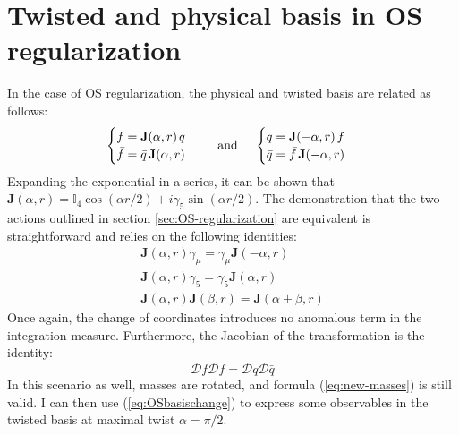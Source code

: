 \documentclass[english, LaM, oneside, noexaminfo]{sapthesis}
\begin{document}
\section{Twisted and physical basis in OS regularization}\label{app:OSreg}
\noindent
In the case of OS regularization, the physical and twisted basis are related as follows:
\begin{equation*}\label{eq:OSbasischange}
    \begin{cases}
        f =  \mathbf{J}(\alpha, r)\hspace*{.5mm} q \\
        \bar f = \bar q \hspace*{.5mm} \mathbf{J}(\alpha, r)
    \end{cases}
    \quad \text{ and } \quad
    \begin{cases}
        q =  \mathbf{J}(-\alpha, r)\hspace*{.5mm} f \\
        \bar q = \bar f \hspace*{.5mm} \mathbf{J}(-\alpha, r)
    \end{cases}
\end{equation*}
Expanding the exponential in a series, it can be shown that $\mathbf{J} (\alpha, r) = \mathbb{I}_4 \cos (\alpha r/2) + i \gamma_5 \sin (\alpha r/2)$.
The demonstration that the two actions outlined in section \ref{sec:OS-regularization} are equivalent is straightforward and relies on the following identities:
\begin{equation*}
    \begin{gathered}
        \mathbf{J}(\alpha,r) \gamma_\mu = \gamma_\mu \mathbf{J}(-\alpha,r) \\
        \mathbf{J}(\alpha,r) \gamma_5 = \gamma_5 \mathbf{J}(\alpha,r) \\
        \mathbf{J}(\alpha,r) \mathbf{J}(\beta,r) = \mathbf{J}(\alpha+\beta,r) 
    \end{gathered}
\end{equation*}
Once again, the change of coordinates introduces no anomalous term in the integration measure.
Furthermore, the Jacobian of the transformation is the identity:
\begin{equation*}
    \mathcal{D} f \mathcal{D} \bar f = \mathcal{D} q \mathcal{D} \bar q
\end{equation*}
In this scenario as well, masses are rotated, and formula (\ref{eq:new-masses}) is still valid.
I can then use (\ref{eq:OSbasischange}) to express some observables in the twisted basis at maximal twist $\alpha = \pi/2$.
\end{document}
